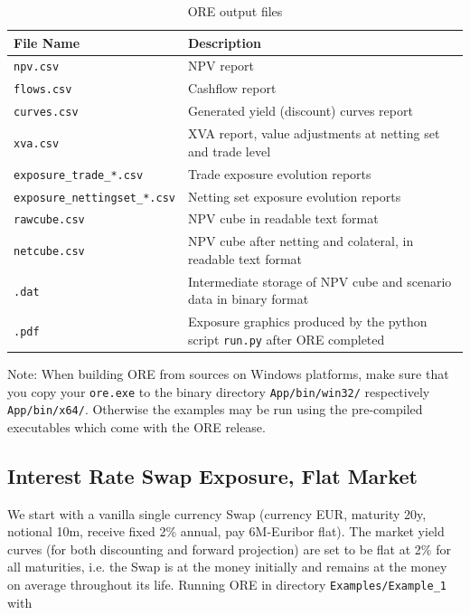 \documentclass[12pt, a4paper]{article}
\begin{document}
{\begin{table}[h]
\scriptsize
\begin{center}
\begin{tabular}{|l|p{11cm}|}
\hline
File Name & Description \\
\hline
{\tt npv.csv}&   NPV report \\
{\tt flows.csv} & Cashflow report \\
{\tt curves.csv} & Generated yield (discount) curves report \\
{\tt xva.csv} & XVA report, value adjustments at netting set and trade level \\
{\tt exposure\_trade\_*.csv} & Trade exposure evolution reports\\
{\tt exposure\_nettingset\_*.csv} &  Netting set exposure evolution reports\\
{\tt rawcube.csv} & NPV cube in readable text format \\
{\tt netcube.csv} & NPV cube after netting and colateral, in readable text format \\
{\tt *.dat} & Intermediate storage of NPV cube and scenario data in binary format \\
{\tt *.pdf} &  Exposure graphics produced by the python script {\tt run.py} after ORE completed\\
\hline
\end{tabular}
\end{center}
\caption{ORE output files}
\label{tab_2}
\end{table}

Note: When building ORE from sources on Windows platforms, make sure that you copy your {\tt ore.exe} to the binary
directory {\tt App/bin/win32/} respectively {\tt App/bin/x64/}. Otherwise the examples may be run using the pre-compiled
executables which come with the ORE release.

\subsection{Interest Rate Swap Exposure, Flat Market}\label{sec:example1}

We start with a vanilla single currency Swap (currency EUR, maturity 20y, notional 10m, receive fixed 2\% annual, pay
6M-Euribor flat). The market yield curves (for both discounting and forward projection) are set to be flat at 2\% for
all maturities, i.e. the Swap is at the money initially and remains at the money on average throughout its life. Running
ORE in directory {\tt Examples/Example\_1} with

}
\end{document}
